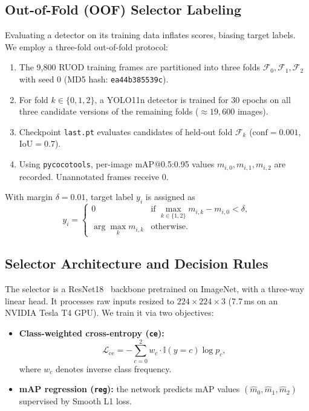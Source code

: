 \documentclass[runningheads]{llncs}
\begin{document}
\subsection{Out-of-Fold (OOF) Selector Labeling}
\label{sec:method-labels}

Evaluating a detector on its training data inflates scores, biasing target labels. We employ a three-fold out-of-fold protocol:
\begin{enumerate}
    \item The 9{,}800 RUOD training frames are partitioned into three folds $\mathcal{F}_0, \mathcal{F}_1, \mathcal{F}_2$ with seed 0 (MD5 hash: \texttt{ea44b385539c}).
    \item For fold $k \in \{0, 1, 2\}$, a YOLO11n detector is trained for 30 epochs on all three candidate versions of the remaining folds ($\approx 19{,}600$ images).
    \item Checkpoint \texttt{last.pt} evaluates candidates of held-out fold $\mathcal{F}_k$ ($\text{conf} = 0.001$, $\text{IoU} = 0.7$).
    \item Using \texttt{pycocotools}, per-image mAP@0.5:0.95 values $m_{i,0}, m_{i,1}, m_{i,2}$ are recorded. Unannotated frames receive 0.
\end{enumerate}
With margin $\delta = 0.01$, target label $y_i$ is assigned as
\begin{equation}
    y_i =
    \begin{cases}
        0                    & \text{if } \max_{k \in \{1, 2\}} m_{i,k} - m_{i,0} < \delta, \\
        \arg\max_{k} m_{i,k} & \text{otherwise}.
    \end{cases}
\end{equation}

\subsection{Selector Architecture and Decision Rules}

The selector is a ResNet18~\cite{heDeepResidualLearning2016} backbone pretrained on ImageNet, with a three-way linear head. It processes raw inputs resized to $224 \times 224 \times 3$ (7.7\,ms on an NVIDIA Tesla T4 GPU). We train it via two objectives:
\begin{itemize}
    \item \textbf{Class-weighted cross-entropy (\texttt{ce}):}
          \begin{equation}
              \mathcal{L}_{\mathrm{ce}} = -\sum_{c=0}^2 w_c \cdot \mathbb{I}(y = c) \log p_c,
          \end{equation}
          where $w_c$ denotes inverse class frequency.
    \item \textbf{mAP regression (\texttt{reg}):} the network predicts mAP values $(\hat{m}_0, \hat{m}_1, \hat{m}_2)$ supervised by Smooth L1 loss.
\end{itemize}
\end{document}
